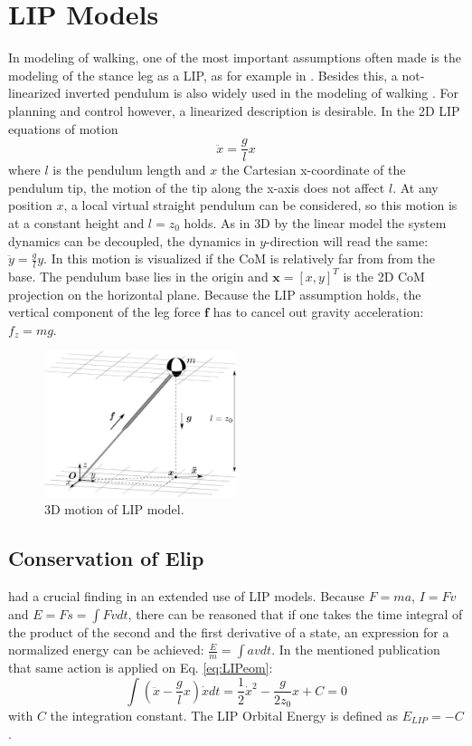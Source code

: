 \section{\ac{LIP} Models}
In modeling of walking, one of the most important assumptions often made is the modeling of the stance leg as a \ac{LIP}, as for example in \cite{kajita20013d}. Besides this, a not-linearized inverted pendulum is also widely used in the modeling of walking \cite{kuo2005energetic}. For planning and control however, a linearized description is desirable. In the \ac{2D} \ac{LIP} equations of motion
\begin{equation}
\ddot{x}=\frac{g}{l}x
\label{eq:LIPeom}
\end{equation}
where $l$ is the pendulum length and $x$ the Cartesian x-coordinate of the pendulum tip, the motion of the tip along the x-axis does not affect $l$. At any position $x$, a local virtual straight pendulum can be considered, so this motion is at a constant height and $l=z_0$  holds. As in \ac{3D} by the linear model the system dynamics can be decoupled, the dynamics in $y$-direction will read the same: $\ddot{y}=\frac{g}{l} y$. In  this motion is visualized if the \ac{CoM} is relatively far from from the base. The pendulum base lies in the origin and $\boldsymbol{x} = [x,y]^T$ is the \ac{2D} \ac{CoM} projection on the horizontal plane. Because the \ac{LIP} assumption holds, the vertical component of the leg force $\boldsymbol{f}$ has to cancel out gravity acceleration: $f_z=mg$.
\begin{figure}[h]
\centering
\includegraphics[width=0.5\textwidth]{STYLESTUFF/3DCoMwithoutfoot.png}
\caption{\ac{3D} motion of \ac{LIP} model.}
\label{fig:3dlip}
\end{figure}

\subsection{Conservation of \ac{Elip}}
\cite{kajita1992dynamic} had a crucial finding in an extended use of \ac{LIP} models. Because $F=ma$, $I=Fv$ and $E = Fs = \int Fv dt$, there can be reasoned that if one takes the time integral of the product of the second and the first derivative of a state, an expression for a normalized energy can be achieved: $\frac{E}{m}=\int av dt$. In the mentioned publication that same action is applied on Eq. \eqref{eq:LIPeom}:
\begin{equation}
\int (\ddot{x}-\frac{g}{l}x)\dot{x} dt = \frac{1}{2}\dot{x}^2-\frac{g}{2z_0}x +C=0
\label{eq:Elip}
\end{equation}
with $C$ the integration constant. The \ac{LIP} Orbital Energy is defined as $E_{LIP}=-C$. 

